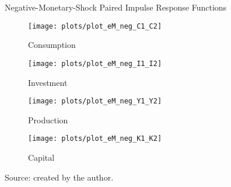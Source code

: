 \documentclass[../thesis.tex]{subfiles}
\begin{document}
\begin{figure}[h!]
	\centering
	\caption{Negative-Monetary-Shock Paired Impulse Response Functions}
	\begin{subfigure}[b]{0.48\textwidth}
		\centering
		\texttt{[image: plots/plot\_eM\_neg\_C1\_C2]}
		\caption{\scriptsize Consumption}
		\label{fig:plot_eM_neg_C1_C2}
	\end{subfigure}
	\hspace*{0.3cm}
	\begin{subfigure}[b]{0.48\textwidth}
		\centering
		\texttt{[image: plots/plot\_eM\_neg\_I1\_I2]}
		\caption{\scriptsize Investment}
		\label{fig:plot_eM_neg_I1_I2}
	\end{subfigure}
	\vspace*{0.1cm}
	\begin{subfigure}[b]{0.48\textwidth}
		\centering
		\texttt{[image: plots/plot\_eM\_neg\_Y1\_Y2]}
		\caption{\scriptsize Production}
		\label{fig:plot_eM_neg_Y1_Y2}
	\end{subfigure}
	\hspace*{0.3cm}
	\begin{subfigure}[b]{0.48\textwidth}
		\centering
		\texttt{[image: plots/plot\_eM\_neg\_K1\_K2]}
		\caption{\scriptsize Capital}
		\label{fig:plot_eM_neg_K1_K2}
	\end{subfigure}
	\caption*{Source: created by the author.}
	\label{fig:paired-neg-irf}
\end{figure}

\newpage
\end{document}
